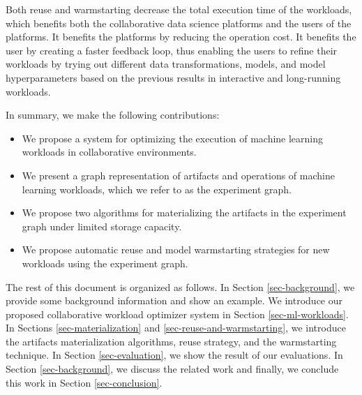 Both reuse and warmstarting decrease the total execution time of the workloads, which benefits both the collaborative data science platforms and the users of the platforms.
It benefits the platforms by reducing the operation cost.
It benefits the user by creating a faster feedback loop, thus enabling the users to refine their workloads by trying out different data transformations, models, and model hyperparameters based on the previous results in interactive and long-running workloads.

In summary, we make the following contributions:
\begin{itemize}
\item We propose a system for optimizing the execution of machine learning workloads in collaborative environments.
\item We present a graph representation of artifacts and operations of machine learning workloads, which we refer to as the experiment graph.
\item We propose two algorithms for materializing the artifacts in the experiment graph under limited storage capacity.
\item We propose automatic reuse and model warmstarting strategies for new workloads using the experiment graph.
\end{itemize}

The rest of this document is organized as follows.
In Section \ref{sec-background}, we provide some background information and show an example.
We introduce our proposed collaborative workload optimizer system in Section \ref{sec-ml-workloads}.
In Sections \ref{sec-materialization} and \ref{sec-reuse-and-warmstarting}, we introduce the artifacts materialization algorithms, reuse strategy, and the warmstarting technique. 
In Section \ref{sec-evaluation}, we show the result of our evaluations.
In Section \ref{sec-background}, we discuss the related work and finally, we conclude this work in Section \ref{sec-conclusion}.